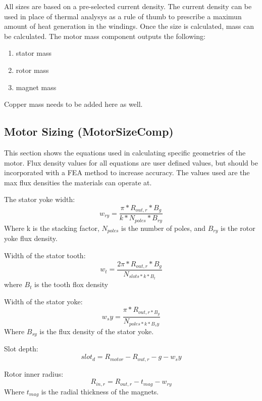 \documentclass[10pt]{article}
\begin{document}
All sizes are based on a pre-selected current density. The current density can be used in place of thermal analysys as a rule of thumb to prescribe a maximun amount of heat generation in the windings. Once the size is calculated, mass can be calculated. The motor mass component outputs the following:
\begin{enumerate}
    \item stator mass
    \item rotor mass
    \item magnet mass
\end{enumerate}
Copper mass needs to be added here as well.

\subsection{Motor Sizing (MotorSizeComp)}
This section shows the equations used in calculating specific geometries of the motor. Flux density values for all equations are user defined values, but should be incorporated with a FEA method to increase accuracy. The values used are the max flux densities the materials can operate at.

The stator yoke width:
\begin{equation}
    w_{ry} = \frac{\pi*R_{out,r}*B_{g}}{k*N_{poles}*B_{ry}}
\end{equation}
Where k is the stacking factor, $N_{poles}$ is the number of poles, and $B_{ry}$ is the rotor yoke flux density.

Width of the stator tooth:
\begin{equation}
    w_t = \frac{2\pi*R_{out, r}*B_g}  { N_{slots*k*B_t}}
\end{equation}
where $B_t$ is the tooth flox density

Width of the stator yoke:
\begin{equation}
    w_sy = \frac{\pi*R_{out, r*B_g}}  { N_{poles*k*B_sy}}
\end{equation}
Where $B_{sy}$ is the flux density of the stator yoke.

Slot depth:
\begin{equation}
    slot_d = R_{motor}- R_{out, r} - g - w_sy
\end{equation}

Rotor inner radius:
\begin{equation}
    R_{in, r} = R_{out, r} - t_{mag} - w_{ry}
\end{equation}
Where $t_{mag}$ is the radial thickness of the magnets.
\end{document}
